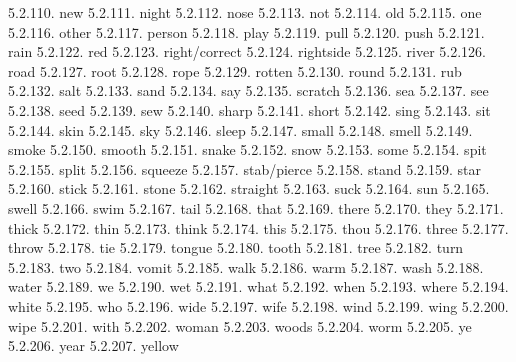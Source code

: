 5.2.110. new
5.2.111. night
5.2.112. nose
5.2.113. not
5.2.114. old
5.2.115. one
5.2.116. other
5.2.117. person
5.2.118. play
5.2.119. pull
5.2.120. push
5.2.121. rain
5.2.122. red
5.2.123. right/correct
5.2.124. rightside
5.2.125. river
5.2.126. road
5.2.127. root
5.2.128. rope
5.2.129. rotten
5.2.130. round
5.2.131. rub
5.2.132. salt
5.2.133. sand
5.2.134. say
5.2.135. scratch
5.2.136. sea
5.2.137. see
5.2.138. seed
5.2.139. sew
5.2.140. sharp
5.2.141. short
5.2.142. sing
5.2.143. sit
5.2.144. skin
5.2.145. sky
5.2.146. sleep
5.2.147. small
5.2.148. smell
5.2.149. smoke
5.2.150. smooth
5.2.151. snake
5.2.152. snow
5.2.153. some
5.2.154. spit
5.2.155. split
5.2.156. squeeze
5.2.157. stab/pierce
5.2.158. stand
5.2.159. star
5.2.160. stick
5.2.161. stone
5.2.162. straight
5.2.163. suck
5.2.164. sun
5.2.165. swell
5.2.166. swim
5.2.167. tail
5.2.168. that
5.2.169. there
5.2.170. they
5.2.171. thick
5.2.172. thin
5.2.173. think
5.2.174. this
5.2.175. thou
5.2.176. three
5.2.177. throw
5.2.178. tie
5.2.179. tongue
5.2.180. tooth
5.2.181. tree
5.2.182. turn
5.2.183. two
5.2.184. vomit
5.2.185. walk
5.2.186. warm
5.2.187. wash
5.2.188. water
5.2.189. we
5.2.190. wet
5.2.191. what
5.2.192. when
5.2.193. where
5.2.194. white
5.2.195. who
5.2.196. wide
5.2.197. wife
5.2.198. wind
5.2.199. wing
5.2.200. wipe
5.2.201. with
5.2.202. woman
5.2.203. woods
5.2.204. worm
5.2.205. ye
5.2.206. year
5.2.207. yellow

